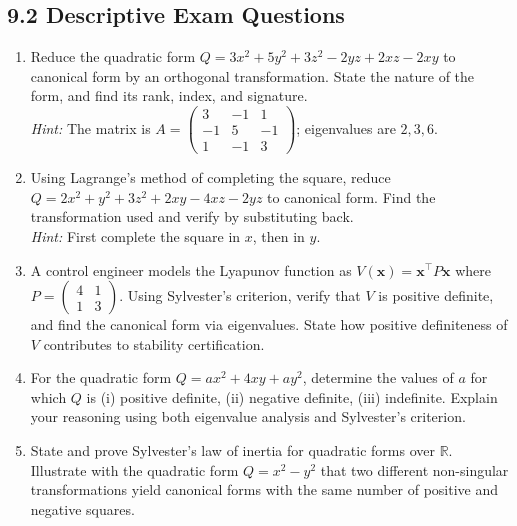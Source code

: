 \documentclass[12pt,a4paper]{article}
\begin{document}
\subsection*{9.2 Descriptive Exam Questions}

\begin{enumerate}[leftmargin=2em, label=\textbf{D\arabic*.}]
  \item Reduce the quadratic form $Q = 3x^{2} + 5y^{2} + 3z^{2} - 2yz + 2xz - 2xy$ to canonical form by an orthogonal transformation. State the nature of the form, and find its rank, index, and signature. \\
  \textit{Hint:} The matrix is $A = \begin{pmatrix}3&-1&1\\-1&5&-1\\1&-1&3\end{pmatrix}$; eigenvalues are $2, 3, 6$.

  \item Using Lagrange's method of completing the square, reduce $Q = 2x^{2} + y^{2} + 3z^{2} + 2xy - 4xz - 2yz$ to canonical form. Find the transformation used and verify by substituting back. \\
  \textit{Hint:} First complete the square in $x$, then in $y$.

  \item A control engineer models the Lyapunov function as $V(\mathbf{x}) = \mathbf{x}^{\top}P\mathbf{x}$ where
  $P = \begin{pmatrix}4&1\\1&3\end{pmatrix}$.
  Using Sylvester's criterion, verify that $V$ is positive definite, and find the canonical form via eigenvalues. State how positive definiteness of $V$ contributes to stability certification.

  \item For the quadratic form $Q = ax^{2} + 4xy + ay^{2}$, determine the values of $a$ for which $Q$ is (i) positive definite, (ii) negative definite, (iii) indefinite. Explain your reasoning using both eigenvalue analysis and Sylvester's criterion.

  \item State and prove Sylvester's law of inertia for quadratic forms over $\mathbb{R}$. Illustrate with the quadratic form $Q = x^{2} - y^{2}$ that two different non-singular transformations yield canonical forms with the same number of positive and negative squares.
\end{enumerate}
\end{document}
